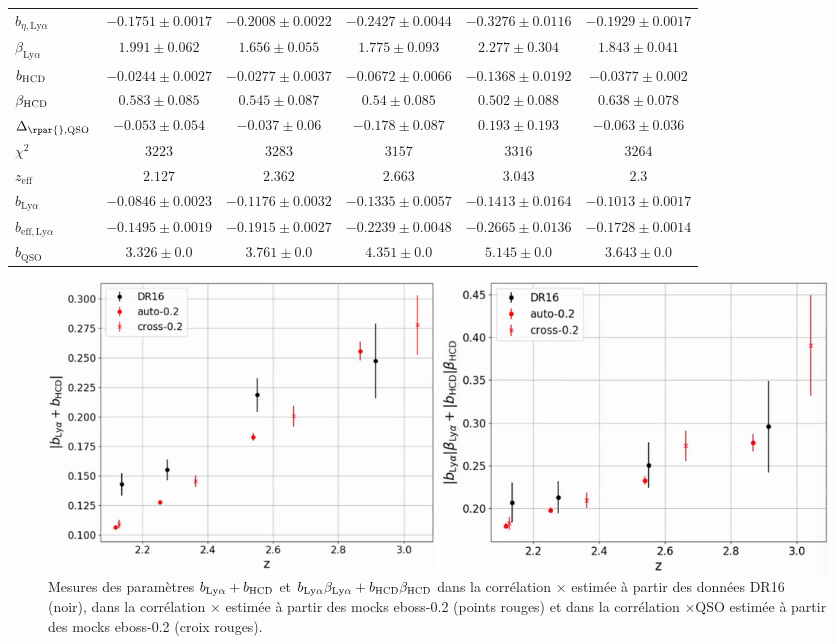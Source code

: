 \begin{table}[h]
\begin{tabular}{lccccc}
$b_{\eta, \mathrm{Ly}\alpha} $ & $ -0.1751 \pm 0.0017$ & $ -0.2008 \pm 0.0022$ & $ -0.2427 \pm 0.0044$ & $ -0.3276 \pm 0.0116$ & $ -0.1929 \pm 0.0017$ \\
$\beta_{\mathrm{Ly}\alpha} $ & $ 1.991 \pm 0.062$ & $ 1.656 \pm 0.055$ & $ 1.775 \pm 0.093$ & $ 2.277 \pm 0.304$ & $ 1.843 \pm 0.041$ \\
$b_{\textsc{HCD}} $ & $ -0.0244 \pm 0.0027$ & $ -0.0277 \pm 0.0037$ & $ -0.0672 \pm 0.0066$ & $ -0.1368 \pm 0.0192$ & $ -0.0377 \pm 0.002$ \\
$\beta_{\textsc{HCD}} $ & $ 0.583 \pm 0.085$ & $ 0.545 \pm 0.087$ & $ 0.54 \pm 0.085$ & $ 0.502 \pm 0.088$ & $ 0.638 \pm 0.078$ \\
$\Delta_{\rpar{}, \textsc{QSO}}$ & $ -0.053 \pm 0.054$ & $ -0.037 \pm 0.06$ & $ -0.178 \pm 0.087$ & $ 0.193 \pm 0.193$ & $ -0.063 \pm 0.036$ \\
\midrule
$\chi^2$ & $ 3223 $ & $ 3283 $ & $ 3157 $ & $ 3316 $ & $ 3264 $ \\
$z_{\mathrm{eff}}$ & $ 2.127 $ & $ 2.362 $ & $ 2.663 $ & $ 3.043 $ & $ 2.3 $ \\
\midrule
$b_{\mathrm{Ly}\alpha} $ & $ -0.0846 \pm 0.0023$ & $ -0.1176 \pm 0.0032$ & $ -0.1335 \pm 0.0057$ & $ -0.1413 \pm 0.0164$ & $ -0.1013 \pm 0.0017$ \\
$b_{\mathrm{eff}, \mathrm{Ly}\alpha} $ & $ -0.1495 \pm 0.0019$ & $ -0.1915 \pm 0.0027$ & $ -0.2239 \pm 0.0048$ & $ -0.2665 \pm 0.0136$ & $ -0.1728 \pm 0.0014$ \\
$b_{\mathrm{QSO}} $ & $ 3.326 \pm 0.0$ & $ 3.761 \pm 0.0$ & $ 4.351 \pm 0.0$ & $ 5.145 \pm 0.0$ & $ 3.643 \pm 0.0$ \\
\bottomrule
  \end{tabular}
\end{table}

\begin{figure}
  \centering
  \includegraphics[scale=0.4]{sum_bias}
  \caption{Mesures des paramètres $b_{\mathrm{Ly}\alpha} + b_{\textsc{HCD}}$ et $b_{\mathrm{Ly}\alpha}\beta_{\mathrm{Ly}\alpha} + b_{\textsc{HCD}}\beta_{\textsc{HCD}}$ dans la corrélation \lya{}$\times$\lya{} estimée à partir des données DR16 (noir), dans la corrélation \lya{}$\times$\lya{} estimée à partir des mocks eboss-0.2 (points rouges) et dans la corrélation \lya{}$\times$QSO estimée à partir des mocks eboss-0.2 (croix rouges).}
  \label{fig:sum_bias}
\end{figure}

